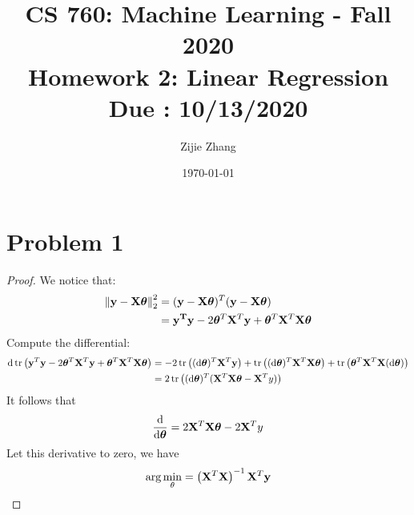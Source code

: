 \documentclass{article}
\title{CS 760: Machine Learning - Fall 2020\\
        {\Large \textbf{Homework 2: Linear Regression}}\\
        {\normalsize \textbf{Due : 10/13/2020}}
    }
\author{Zijie Zhang}
\date{\today}
\begin{document}
    \maketitle
    
\section*{Problem 1}
    \begin{proof}
    We notice that:
    \begin{align*}
        \norm{\vb{y-X\bm{\theta}}}_2^2
        &=(\vb{y-X\bm{\theta}})^T (\vb{y-X\bm{\theta}})\\
        &=\vb{y^Ty}-2\bm{\theta}^T\vb{X}^T\vb{y}+\bm{\theta}^T\vb{X}^T\vb{X}\bm{\theta}
    \end{align*}
    Compute the differential:
    \begin{align*}
        \text{d}\tr\left(\vb{y}^T\vb{y}-2\bm{\theta}^T\vb{X}^T\vb{y}+\bm{\theta}^T\vb{X}^T\vb{X}\bm{\theta}\right)
        &= -2\tr\left((\text{d}\bm{\theta})^T \vb{X}^T \vb{y}\right)
            +\tr\left((\text{d}\bm{\theta})^T \vb{X}^T\vb{X}\bm{\theta}\right)
            +\tr\left(\bm{\theta}^T \vb{X}^T\vb{X} (\text{d}\bm{\theta})\right)\\
        &= 2\tr\left((\text{d}\bm{\theta})^T(\vb{X}^T\vb{X}\bm{\theta}-\vb{X}^T y)\right)
    \end{align*}
    It follows that
    $$\frac{\text{d}}{\text{d}\bm{\theta}}=2\vb{X}^T\vb{X}\bm{\theta}-2\vb{X}^T y$$
    Let this derivative to zero, we have
    $$\arg{\min_\theta}=\left(\vb{X}^T\vb{X}\right)^{-1}\vb{X}^T\vb{y}$$
    \end{proof}

\end{document}
